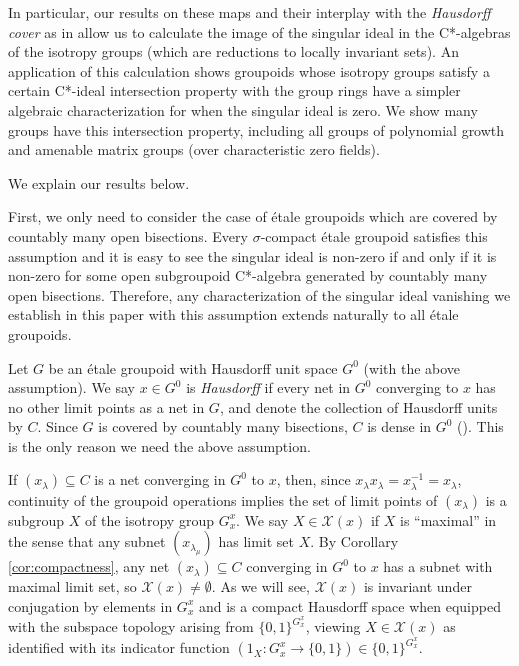 \documentclass[a4paper, 12pt]{amsart}
\theoremstyle{definition}
\theoremstyle{remark}
\numberwithin{equation}{section}
\begin{document}
In particular, our results on these maps and their interplay with the \emph{Hausdorff cover} as in \cite{BGHL25} allow us to calculate the image of the singular ideal in the C*-algebras of the isotropy groups (which are reductions to locally invariant sets). An application of this calculation shows groupoids whose isotropy groups satisfy a certain C*-ideal intersection property with the group rings have a simpler algebraic characterization for when the singular ideal is zero. We show many groups have this intersection property, including all groups of polynomial growth and amenable matrix groups (over characteristic zero fields).

We explain our results below.

First, we only need to consider the case of \'etale groupoids which are covered by countably many open bisections. Every $\sigma$-compact \'etale groupoid satisfies this assumption and it is easy to see the singular ideal is non-zero if and only if it is non-zero for some open subgroupoid C*-algebra generated by countably many open bisections. Therefore, any characterization of the singular ideal vanishing we establish in this paper with this assumption extends naturally to all \'etale groupoids.

Let $G$ be an \'etale groupoid with Hausdorff unit space $G^{0}$ (with the above assumption). We say $x\in G^{0}$ is \emph{Hausdorff} if every net in $G^{0}$ converging to $x$ has no other limit points as a net in $G$, and denote the collection of Hausdorff units by $C$. Since $G$ is covered by countably many bisections, $C$ is dense in $G^{0}$ (\cite[Lemma~7.15]{KM21}). This is the only reason we need the above assumption.

If $(x_{\lambda})\subseteq C$ is a net converging in $G^{0}$ to $x$, then, since $x_{\lambda}x_{\lambda} = x^{-1}_{\lambda} = x_{\lambda}$, continuity of the groupoid operations implies the set of limit points of $(x_{\lambda})$ is a subgroup $X$ of the isotropy group $G_{x}^{x}$. We say $X\in \mathcal{X}(x)$ if $X$ is ``maximal'' in the sense that any subnet $(x_{\lambda_{\mu}})$ has limit set $X$. By Corollary \ref{cor:compactness}, any net $(x_{\lambda})\subseteq C$ converging in $G^{0}$ to $x$ has a subnet with maximal limit set, so $\mathcal{X}(x)\neq\emptyset$. As we will see, $\mathcal{X}(x)$ is invariant under conjugation by elements in $G^{x}_{x}$ and is a compact Hausdorff space when equipped with the subspace topology arising from $\{0,1\}^{G^{x}_{x}}$, viewing $X\in\mathcal{X}(x)$ as identified with its indicator function $(1_{X}:G^{x}_{x}\to \{0,1\})\in \{0,1\}^{G^{x}_{x}}$.
\end{document}
